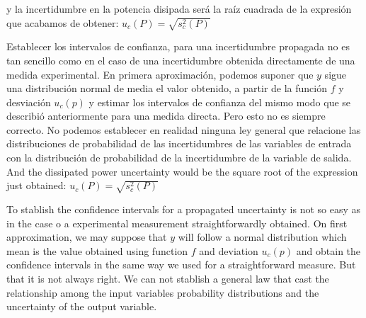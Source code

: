 \begin{paracol}{2}
y la incertidumbre en la potencia disipada será la raíz cuadrada de la expresión que acabamos de obtener:  $u_c(P) =\sqrt{s_c^2(P)} $

Establecer los intervalos de confianza, para una incertidumbre propagada no es tan sencillo como en el caso de una incertidumbre obtenida directamente de una medida experimental. En primera aproximación, podemos suponer que $y$ sigue una distribución normal de media el valor obtenido, a partir de la función $f$ y desviación $u_c(p)$ y estimar los intervalos de confianza del mismo modo que se describió anteriormente para una medida directa.  Pero esto no es siempre correcto. No podemos establecer en realidad ninguna ley general que relacione las distribuciones de probabilidad de las incertidumbres de las variables de entrada con la distribución de probabilidad de la incertidumbre de la variable de salida.
\switchcolumn
And the dissipated power uncertainty would be the square root of the expression just obtained: $u_c(P) =\sqrt{s_c^2(P)} $

To stablish the confidence intervals for a propagated uncertainty is not so easy as in the case o a experimental measurement straightforwardly obtained. On first approximation, we may suppose that $y$ will follow a normal distribution which mean is the value obtained using function $f$ and deviation $u_c(p)$ and obtain the confidence intervals in the same way we used for a straightforward measure. But that it is not always right. We can not stablish a general law that cast the relationship among the input variables probability distributions and the uncertainty of the output variable.   
\end{paracol}

